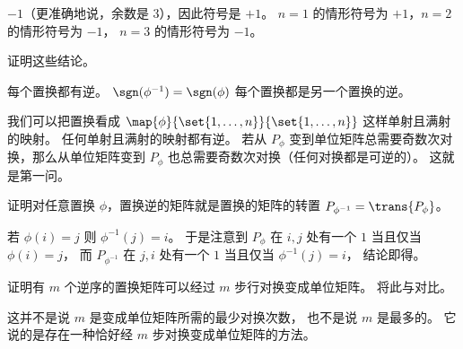\begin{exercises}
\begin{answer}
      $-1$（更准确地说，余数是 $3$），因此符号是 $+1$。
      $n=1$ 的情形符号为 $+1$，$n=2$ 的情形符号为 $-1$，
      $n=3$ 的情形符号为 $-1$。
    \end{answer}
  \item \label{exer:PermInvFacts}
     证明这些结论。   
     \begin{exparts}
        \partsitem 每个置换都有逆。
        \partsitem \( \sgn(\phi^{-1})=\sgn(\phi) \)
        \partsitem 每个置换都是另一个置换的逆。
     \end{exparts}
    \begin{answer}
      \begin{exparts}
       \partsitem 我们可以把置换看成
         \( \map{\phi}{\set{1,\ldots,n}}{\set{1,\ldots,n}} \)
         这样单射且满射的映射。
         任何单射且满射的映射都有逆。
       \partsitem 若从 \( P_\phi \)
         变到单位矩阵总需要奇数次对换，那么从单位矩阵变到
         \( P_\phi \) 也总需要奇数次对换（任何对换都是可逆的）。
       \partsitem 这就是第一问。
      \end{exparts}  
    \end{answer}
  \item \label{exer:PermInvIffMatTrans}
      证明对任意置换 $\phi$，置换逆的矩阵就是置换的矩阵的转置
      $P_{\phi^{-1}}=\trans{P_{\phi}}$。
      \begin{answer}
        若 $\phi(i)=j$ 则 $\phi^{-1}(j)=i$。
        于是注意到 $P_{\phi}$ 在 $i,j$ 处有一个 $1$ 当且仅当 $\phi(i)=j$，
        而 $P_{\phi^{-1}}$ 在 $j,i$ 处有一个 $1$ 当且仅当 $\phi^{-1}(j)=i$，
        结论即得。
      \end{answer}
  \recommended \item 
    证明有 \( m \) 个逆序的置换矩阵可以经过 \( m \) 步行对换变成单位矩阵。
    将此与对比。
    \begin{answer}
      这并不是说 \( m \) 是变成单位矩阵所需的最少对换次数，
      也不是说 \( m \) 是最多的。
      它说的是存在一种恰好经 \( m \) 步对换变成单位矩阵的方法。


\end{answer}
\end{exercises}
